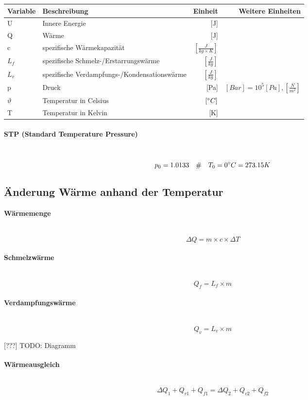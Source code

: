 \documentclass[a4paper,10pt]{article}
\newcommand{\lbparagraph}[1]{\paragraph{#1}\mbox{}\\}
\newcommand{\eqsp}[1]{\quad\#\quad}
\begin{document}
\begin{tabular}{l|l|r|r}
    Variable & Beschreibung & Einheit & Weitere Einheiten \\
    \hline
    U & Innere Energie & [J] & \\
    Q & Wärme & [J] & \\
    c & spezifische Wärmekapazität & $[\frac{J}{kg \times K}]$ & \\
    $L_f$ & spezifische Schmelz-/Erstarrungswärme & $[\frac{J}{kg}]$ & \\
    $L_v$ & spezifische Verdampfungs-/Kondensationswärme & $[\frac{J}{kg}]$ & \\
    p & Druck & [Pa] & $[Bar] =10^5 [Pa], [\frac{N}{m^2}]$ \\
    $\vartheta$ & Temperatur in Celsius & $[{\degree}C]$ & \\
    T & Temperatur in Kelvin & [K] &
\end{tabular}

\lbparagraph{STP (Standard Temperature Pressure)}

\begin{equation}
    p_0 = 1.0133
    \eqsp{}
    T_0 = 0{\degree}C = 273.15K 
\end{equation}

\subsection{Änderung Wärme anhand der Temperatur}

\lbparagraph{Wärmemenge}

\begin{equation}
    {\Delta}Q = m \times c \times {\Delta}T
\end{equation}

\lbparagraph{Schmelzwärme}

\begin{equation}
    Q_f = L_f \times m
\end{equation}

\lbparagraph{Verdampfungswärme}

\begin{equation}
    Q_v = L_v \times m
\end{equation}

[???] TODO: Diagramm

\lbparagraph{Wärmeausgleich}

\begin{equation}
    {\Delta}Q_1 + Q_{v1} + Q_{f1} = {\Delta}Q_2 + Q_{v2} + Q_{f2}    
\end{equation}
\end{document}
